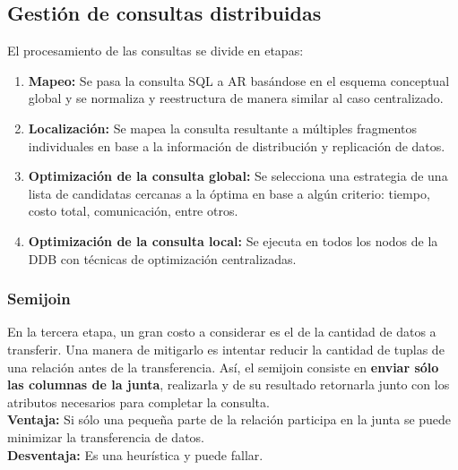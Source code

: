 \subsection*{Gestión de consultas distribuidas}
El procesamiento de las consultas se divide en etapas:
\begin{enumerate}
    \item \textbf{Mapeo:} Se pasa la consulta SQL a AR basándose en el esquema conceptual global y se normaliza y reestructura de manera similar al caso centralizado.
    \item \textbf{Localización:} Se mapea la consulta resultante a múltiples fragmentos individuales en base a la información de distribución y replicación de datos.
    \item \textbf{Optimización de la consulta global:} Se selecciona una estrategia de una lista de candidatas cercanas a la óptima en base a algún criterio: tiempo, costo total, comunicación, entre otros.
    \item \textbf{Optimización de la consulta local:} Se ejecuta en todos los nodos de la DDB con técnicas de optimización centralizadas.
\end{enumerate}

\subsubsection*{Semijoin}
En la tercera etapa, un gran costo a considerar es el de la cantidad de datos a transferir. Una manera de mitigarlo es intentar reducir la cantidad de tuplas de una relación antes de la transferencia. Así, el semijoin consiste en \textbf{enviar sólo las columnas de la junta}, realizarla y de su resultado retornarla junto con los atributos necesarios para completar la consulta. \\
\textbf{Ventaja:} Si sólo una pequeña parte de la relación participa en la junta se puede minimizar la transferencia de datos. \\
\textbf{Desventaja:} Es una heurística y puede fallar.

